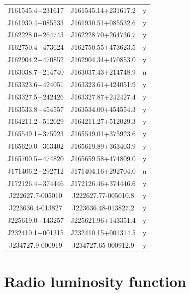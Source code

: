 \begin{table}
\begin{tabular}{ccc}
        J161545.4+231617 & J161545.14+231617.2 & y\\
        J161930.4+085533 & J161930.51+085532.6 & y\\
        J162228.0+264743 & J162228.70+264736.7 & y\\
        J162750.4+473624 & J162750.55+473623.5 & y\\
        J162904.2+470852 & J162904.34+470853.0 & y\\
        J163038.7+214740 & J163037.43+214748.9 & n\\
        J163323.6+424051 & J163323.61+424051.9 & y\\
        J163327.5+242426 & J163327.87+242427.4 & y\\
        J163533.8+454557 & J163534.00+454554.3 & y\\
        J164211.2+512029 & J164211.27+512029.3 & y\\
        J165549.1+375923 & J165549.01+375923.6 & y\\
        J165620.0+363402 & J165619.89+363403.9 & y\\
        J165700.5+474820 & J165659.58+474809.0 & y\\
        J171406.2+292712 & J171404.16+292704.0 & n\\
        J172126.4+374446 & J172126.46+374446.6 & y\\
        J222627.7-005010 & J222627.77-005010.8 & y\\
        J223636.4-013827 & J223636.48-013827.2 & y\\
        J225619.0+143257 & J225621.96+143351.4 & y\\
        J232410.1+001315 & J232410.15+001314.5 & y\\
        J234727.9-000919 & J234727.65-000912.9 & y\\\hline\hline
  \end{tabular}
\end{table}

\section{Radio luminosity function}
\label{sec:rlfs-rlf-desc}

